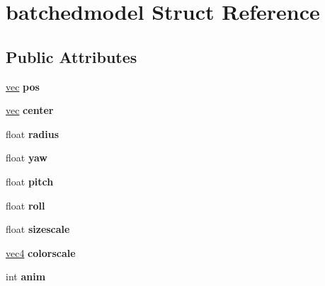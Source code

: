 \hypertarget{structbatchedmodel}{}\section{batchedmodel Struct Reference}
\label{structbatchedmodel}
\subsection*{Public Attributes}
\begin{DoxyCompactItemize}
\item 
\mbox{\label{structbatchedmodel_a0fc2245e53a7d0d1004a26b675a08964}} 
\hyperlink{structvec}{vec} {\bfseries pos}
\item 
\mbox{\label{structbatchedmodel_ac534a8ca0505f6a88346ba12a84c7fc8}} 
\hyperlink{structvec}{vec} {\bfseries center}
\item 
\mbox{\label{structbatchedmodel_a12d3269ba6df0d722a7f817f347468e8}} 
float {\bfseries radius}
\item 
\mbox{\label{structbatchedmodel_aebaa9f1e689f289f98fdc600fc8db1fa}} 
float {\bfseries yaw}
\item 
\mbox{\label{structbatchedmodel_a42dda99ed5de2d8cadfb3170ae06e000}} 
float {\bfseries pitch}
\item 
\mbox{\label{structbatchedmodel_a993d2ea14a7a4b7dcecf9e8aa953bc4e}} 
float {\bfseries roll}
\item 
\mbox{\label{structbatchedmodel_ad2831baee00fa119dc173dd6bae53bea}} 
float {\bfseries sizescale}
\item 
\mbox{\label{structbatchedmodel_a70bff6b1bff4a0bcb4137c50bd7dbed8}} 
\hyperlink{structvec4}{vec4} {\bfseries colorscale}
\item 
\mbox{\label{structbatchedmodel_a1cf39b7cde4ba69ffdb518506aacc141}} 
int {\bfseries anim}
\item 
\mbox{\label{structbatchedmodel_aa340d47b8e0c469e96904e5e16a3a478}} 

\end{DoxyCompactItemize}
